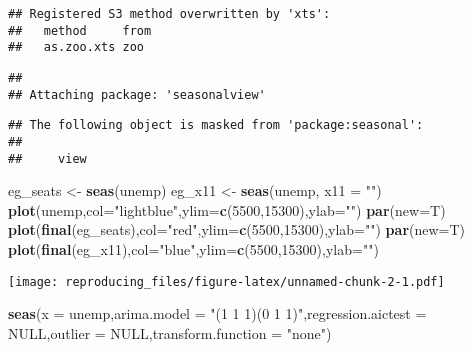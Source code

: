 \documentclass[]{article}
\newenvironment{Shaded}{\begin{snugshade}}{\end{snugshade}}
\newcommand{\DataTypeTok}[1]{\textcolor[rgb]{0.13,0.29,0.53}{#1}}
\newcommand{\DecValTok}[1]{\textcolor[rgb]{0.00,0.00,0.81}{#1}}
\newcommand{\KeywordTok}[1]{\textcolor[rgb]{0.13,0.29,0.53}{\textbf{#1}}}
\newcommand{\NormalTok}[1]{#1}
\newcommand{\OtherTok}[1]{\textcolor[rgb]{0.56,0.35,0.01}{#1}}
\newcommand{\StringTok}[1]{\textcolor[rgb]{0.31,0.60,0.02}{#1}}
\begin{document}
\begin{verbatim}
## Registered S3 method overwritten by 'xts':
##   method     from
##   as.zoo.xts zoo
\end{verbatim}

\begin{verbatim}
## 
## Attaching package: 'seasonalview'
\end{verbatim}

\begin{verbatim}
## The following object is masked from 'package:seasonal':
## 
##     view
\end{verbatim}

\begin{Shaded}
\begin{Highlighting}[]
\NormalTok{eg_seats <-}\StringTok{ }\KeywordTok{seas}\NormalTok{(unemp)}
\NormalTok{eg_x11 <-}\StringTok{ }\KeywordTok{seas}\NormalTok{(unemp, }\DataTypeTok{x11 =} \StringTok{""}\NormalTok{)}
\KeywordTok{plot}\NormalTok{(unemp,}\DataTypeTok{col=}\StringTok{"lightblue"}\NormalTok{,}\DataTypeTok{ylim=}\KeywordTok{c}\NormalTok{(}\DecValTok{5500}\NormalTok{,}\DecValTok{15300}\NormalTok{),}\DataTypeTok{ylab=}\StringTok{""}\NormalTok{)}
\KeywordTok{par}\NormalTok{(}\DataTypeTok{new=}\NormalTok{T)}
\KeywordTok{plot}\NormalTok{(}\KeywordTok{final}\NormalTok{(eg_seats),}\DataTypeTok{col=}\StringTok{"red"}\NormalTok{,}\DataTypeTok{ylim=}\KeywordTok{c}\NormalTok{(}\DecValTok{5500}\NormalTok{,}\DecValTok{15300}\NormalTok{),}\DataTypeTok{ylab=}\StringTok{""}\NormalTok{)}
\KeywordTok{par}\NormalTok{(}\DataTypeTok{new=}\NormalTok{T)}
\KeywordTok{plot}\NormalTok{(}\KeywordTok{final}\NormalTok{(eg_x11),}\DataTypeTok{col=}\StringTok{"blue"}\NormalTok{,}\DataTypeTok{ylim=}\KeywordTok{c}\NormalTok{(}\DecValTok{5500}\NormalTok{,}\DecValTok{15300}\NormalTok{),}\DataTypeTok{ylab=}\StringTok{""}\NormalTok{)}
\end{Highlighting}
\end{Shaded}

\texttt{[image: reproducing\_files/figure-latex/unnamed-chunk-2-1.pdf]}

\begin{Shaded}
\begin{Highlighting}[]
\KeywordTok{seas}\NormalTok{(}\DataTypeTok{x =}\NormalTok{ unemp,}\DataTypeTok{arima.model =} \StringTok{"(1 1 1)(0 1 1)"}\NormalTok{,}\DataTypeTok{regression.aictest =} \OtherTok{NULL}\NormalTok{,}\DataTypeTok{outlier =} \OtherTok{NULL}\NormalTok{,}\DataTypeTok{transform.function =} \StringTok{"none"}\NormalTok{)}
\end{Highlighting}
\end{Shaded}
\end{document}
